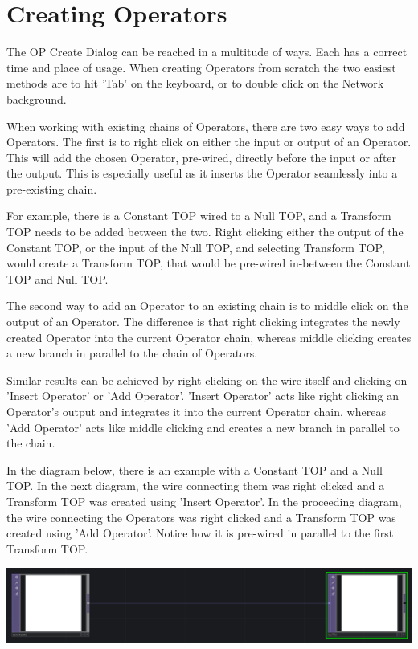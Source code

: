 \section{Creating Operators}
\begin{fullwidth}
The OP Create Dialog can be reached in a multitude of ways. Each has a correct time and place of usage. When creating Operators from scratch the two easiest methods are to hit 'Tab' on the keyboard, or to double click on the Network background.

When working with existing chains of Operators, there are two easy ways to add Operators. The first is to right click on either the input or output of an Operator. This will add the chosen Operator, pre-wired, directly before the input or after the output. This is especially useful as it inserts the Operator seamlessly into a pre-existing chain.

For example, there is a Constant TOP wired to a Null TOP, and a Transform TOP needs to be added between the two. Right clicking either the output of the Constant TOP, or the input of the Null TOP, and selecting Transform TOP, would create a Transform TOP, that would be pre-wired in-between the Constant TOP and Null TOP.

The second way to add an Operator to an existing chain is to middle click on the output of an Operator.  The difference is that right clicking integrates the newly created Operator into the current Operator chain, whereas middle clicking creates a new branch in parallel to the chain of Operators.

Similar results can be achieved by right clicking on the wire itself and clicking on 'Insert Operator' or 'Add Operator'.  'Insert Operator' acts like right clicking an Operator's output and integrates it into the current Operator chain, whereas 'Add Operator' acts like middle clicking and creates a new branch in parallel to the chain.

In the diagram below, there is an example with a Constant TOP and a Null TOP. In the next diagram, the wire connecting them was right clicked and a Transform TOP was created using 'Insert Operator'. In the proceeding diagram, the wire connecting the Operators was right clicked and a Transform TOP was created using 'Add Operator'. Notice how it is pre-wired in parallel to the first Transform TOP.


\begin{center} 
\includegraphics{./img/1.2/creating-operators-1.png}


\end{center}
\end{fullwidth}
